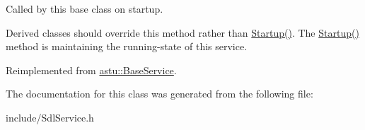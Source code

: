 Called by this base class on startup.

Derived classes should override this method rather than {\ttfamily \hyperlink{classastu_1_1BaseService_a59dade033dcb44dd32155c526a3a58e2}{Startup()}}. The {\ttfamily \hyperlink{classastu_1_1BaseService_a59dade033dcb44dd32155c526a3a58e2}{Startup()}} method is maintaining the running-\/state of this service. 

Reimplemented from \hyperlink{classastu_1_1BaseService_ac8710cd2d6dcc990db65e7c8ccfbc5ff}{astu\+::\+Base\+Service}.



The documentation for this class was generated from the following file\+:\begin{DoxyCompactItemize}
\item 
include/Sdl\+Service.\+h\end{DoxyCompactItemize}
